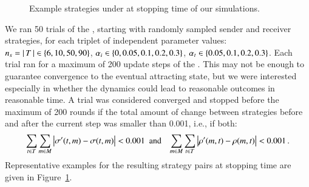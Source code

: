 \begin{figure}


  \caption{Example strategies under \rdd at stopping time of our simulations.}
  \label{fig:example_strats}
\end{figure}

We ran 50 trials of the \rdd, starting with randomly sampled sender
and receiver strategies, for each triplet of independent parameter
values: $n_s = \left \lvert \, T \, \right\rvert \in \left\{6, 10, 50, 90\right\}$, $\alpha_i \in
\left\{0, 0.05, 0.1, 0.2, 0.3\right\}$, $\alpha_t \in \left\{0.05, 0.1, 0.2,
  0.3\right\}$. Each trial ran for a maximum of 200 update steps of the
\rdd. This may not be enough to guarantee convergence to the eventual
attracting state, but we were interested especially in whether the
dynamics could lead to reasonable outcomes in reasonable time. A trial
was considered converged and stopped before the maximum of 200 rounds
if the total amount of change between strategies before and after the
current \rdd step was smaller than 0.001, i.e., if both:
\begin{align*}
  \sum_{t \in T} \sum_{m \in M} \left|
    \sigma^\prime(t,m) - \sigma(t,m) \right| <
  0.001 & \text{\ \ and} &
  \sum_{m \in M} \sum_{t \in T} \left| \rho^\prime(m,t) - \rho(m,t) \right| < 0.001 \,.
\end{align*}
Representative examples for the resulting strategy pairs at stopping
time are given in Figure~\ref{fig:example_strats}.

